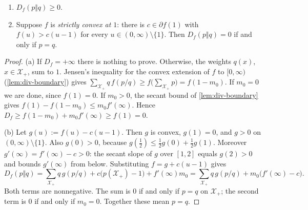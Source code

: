 \begin{proposition}\label{prop:div-nonneg}
\leavevmode
\begin{enumerate}[nosep,label=(\alph*)]
\item $D_f(p\Vert q)\ge0$.
\item Suppose $f$ is \emph{strictly convex at $1$}: there is $c\in\partial f(1)$ with $f(u)>c(u-1)$ for every $u\in(0,\infty)\setminus\{1\}$. Then $D_f(p\Vert q)=0$ if and only if $p=q$.
\end{enumerate}
\end{proposition}
\begin{proof}
(a) If $D_f=+\infty$ there is nothing to prove. Otherwise, the weights $q(x)$, $x\in\mathcal X_+$, sum to $1$.
Jensen's inequality for the convex extension of $f$ to $[0,\infty)$ (\cref{lem:div-boundary}) gives
$\sum_{\mathcal X_+}q\,f(p/q)\ge f\big(\sum_{\mathcal X_+}p\big)=f(1-m_0)$.
If $m_0=0$ we are done, since $f(1)=0$.
If $m_0>0$, the secant bound of \cref{lem:div-boundary} gives $f(1)-f(1-m_0)\le m_0 f'(\infty)$.
Hence $D_f\ge f(1-m_0)+m_0f'(\infty)\ge f(1)=0$.

(b) Let $g(u):=f(u)-c(u-1)$. Then $g$ is convex, $g(1)=0$, and $g>0$ on $(0,\infty)\setminus\{1\}$.
Also $g(0)>0$, because $g(\tfrac12)\le\tfrac12g(0)+\tfrac12g(1)$.
Moreover $g'(\infty)=f'(\infty)-c>0$: the secant slope of $g$ over $[1,2]$ equals $g(2)>0$ and bounds $g'(\infty)$ from below.
Substituting $f=g+c(u-1)$ gives
\[
D_f(p\Vert q)=\sum_{\mathcal X_+}q\,g(p/q)+c\big(p(\mathcal X_+)-1\big)+f'(\infty)m_0
=\sum_{\mathcal X_+}q\,g(p/q)+m_0\big(f'(\infty)-c\big).
\]
Both terms are nonnegative.
The sum is $0$ if and only if $p=q$ on $\mathcal X_+$; the second term is $0$ if and only if $m_0=0$.
Together these mean $p=q$.
\end{proof}


